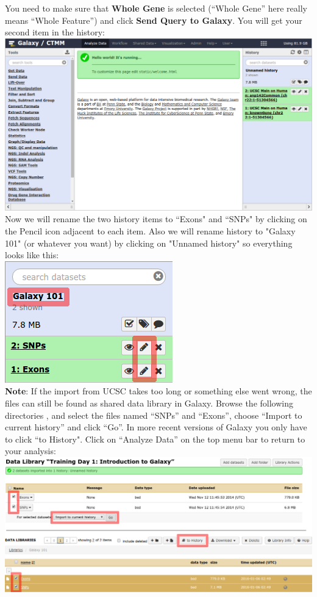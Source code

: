 \documentclass[11pt,a4paper]{article}
\begin{document}
You need to make sure that \textbf{Whole Gene} is selected (``Whole Gene'' here really means ``Whole Feature'') and click \textbf{Send Query to Galaxy}. You will get your second item in the history:\\
\includegraphics[width=\textwidth]{figures/101_08}\\
Now we will rename the two history items to ``Exons" and ``SNPs" by clicking on the Pencil icon adjacent to each item. Also we will rename history to "Galaxy 101" (or whatever you want) by clicking on "Unnamed history" so everything looks like this:\\
\includegraphics[scale=0.65]{figures/101_09}\\
\textbf{Note}: If the import from UCSC takes too long or something else went wrong, the files can still be found as shared data library in Galaxy. Browse the following directories \textit{
\datalibrarydirintroduction}
, and select the files named ``SNPs'' and ``Exons'', choose ``Import to current history'' and click ``Go''. In more recent versions of Galaxy you only have to click ``to History". Click on ``Analyze Data'' on the top menu bar to return to your analysis:\\
\includegraphics[width=\textwidth]{figures/101_10}\\
\end{document}
